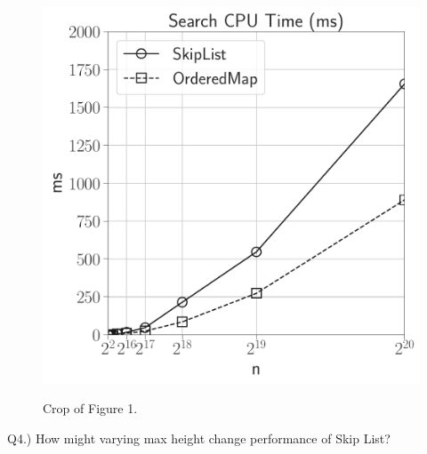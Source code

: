 \documentclass[12pt]{article}
\begin{document}
\begin{figure}[H]
\begin{minipage}{0.32\textwidth}
		\label{fig:physical_memory}
	\end{minipage}\hfill\
	\begin{minipage}{0.32\textwidth}
		\centering
		\includegraphics[width=\linewidth]{../notebook/plot/sl_limsearch_cpu_time_(ms).pdf}
		\label{fig:physical_memory}
	\end{minipage}\hfill
	\caption{Crop of Figure 1.}
\end{figure}


\pagebreak
Q4.) How might varying max height change performance of Skip List?\\
\end{document}
